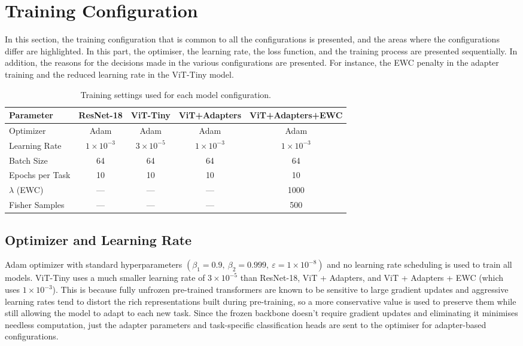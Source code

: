 \documentclass[english, LaM, oneside]{sapthesis}%
\numberwithin{equation}{chapter}
\begin{document}
\section{Training Configuration}
\label{sec:4.4}
In this section, the training configuration that is common to all the configurations is presented, and the areas where the configurations differ are highlighted. In this part, the optimiser, the learning rate, the loss function, and the training process are presented sequentially. In addition, the reasons for the decisions made in the various configurations are presented. For instance, the EWC penalty in the adapter training and the reduced learning rate in the ViT-Tiny model.

\begin{table}[h]
\centering
\caption{Training settings used for each model configuration.}
\label{tab:4.3}
\small
\setlength{\tabcolsep}{4pt}
\renewcommand{\arraystretch}{1.2}
\begin{tabular*}{\textwidth}{@{\extracolsep{\fill}}lcccc@{}}
\toprule
\textbf{Parameter} & \textbf{ResNet-18} & \textbf{ViT-Tiny} & \textbf{ViT+Adapters} & \textbf{ViT+Adapters+EWC} \\
\midrule
Optimizer       & Adam  & Adam  & Adam  & Adam  \\
Learning Rate   & $1\times10^{-3}$  & $3\times10^{-5}$  & $1\times10^{-3}$  & $1\times10^{-3}$  \\
Batch Size      & 64    & 64    & 64    & 64    \\
Epochs per Task & 10    & 10    & 10    & 10    \\
$\lambda$ (EWC)   & ---   & ---   & ---   & 1000  \\
Fisher Samples  & ---   & ---   & ---   & 500   \\
\bottomrule
\end{tabular*}
\end{table}

\subsection{Optimizer and Learning Rate}
Adam optimizer\cite{38} with standard hyperparameters $(\beta_1 = 0.9, \ \beta_2 = 0.999, \ \varepsilon = 1 \times 10^{-8})$ and no learning rate scheduling is used to train all models. ViT-Tiny uses a much smaller learning rate of $3\times10^{-5}$ than ResNet-18, ViT + Adapters, and ViT + Adapters + EWC (which uses $1\times10^{-3}$). This is because fully unfrozen pre-trained transformers are known to be sensitive to large gradient updates and aggressive learning rates tend to distort the rich representations built during pre-training, so a more conservative value is used to preserve them while still allowing the model to adapt to each new task. Since the frozen backbone doesn't require gradient updates and eliminating it minimises needless computation, just the adapter parameters and task-specific classification heads are sent to the optimiser for adapter-based configurations.
\end{document}
